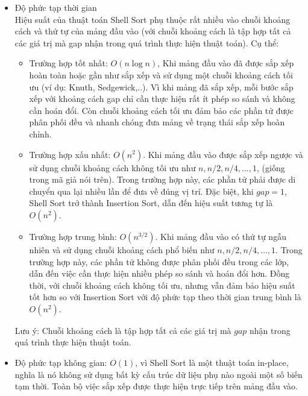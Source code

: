 \begin{itemize}
    \item Độ phức tạp thời gian\\
    Hiệu suất của thuật toán Shell Sort phụ thuộc rất nhiều vào chuỗi 
    khoảng cách và thứ tự của mảng đầu vào (với chuỗi khoảng cách là tập 
    hợp tất cả các giá trị mà gap nhận trong quá trình thực hiện thuật 
    toán). Cụ thể:
    \begin{itemize}[label=$\circ$]
        \item Trường hợp tốt nhất: $O\left(n\log{n}\right)$, Khi mảng đầu vào 
        đã được sắp xếp hoàn toàn hoặc gần như sắp xếp và sử dụng một chuỗi 
        khoảng cách tối ưu (ví dụ: Knuth, Sedgewick,..). Vì khi mảng đã sắp 
        xếp, mỗi bước sắp xếp với khoảng cách gap chỉ cần thực hiện rất ít 
        phép so sánh và không cần hoán đổi. Còn chuỗi khoảng cách tối ưu đảm 
        bảo các phần tử được phân phối đều và nhanh chóng đưa mảng về trạng 
        thái sắp xếp hoàn chỉnh.

        \pagebreak

        \item Trường hợp xấu nhất: $O\left(n^2\right)$. Khi mảng đầu vào được 
        sắp xếp ngược và sử dụng chuỗi khoảng cách không tối ưu như $n,n/2,n/4,
        \ldots,1$, (giống trong mã giả nói trên). Trong trường hợp này, các 
        phần tử phải được di chuyển qua lại nhiều lần để đưa về đúng vị trí. 
        Đặc biệt, khi $gap = 1$, Shell Sort trở thành Insertion Sort, dẫn đến 
        hiệu suất tương tự là $O\left(n^2\right)$.
        \item Trường hợp trung bình: $O\left(n^{3/2}\right)$. Khi mảng đầu vào 
        có thứ tự ngẫu nhiên và sử dụng chuỗi khoảng cách phổ biến như $n,n/2,
        n/4,\ldots,1$. Trong trường hợp này, các phần tử không được phân phối 
        đều trong các lớp, dẫn đến việc cần thực hiện nhiều phép so sánh và 
        hoán đổi hơn. Đồng thời, với chuỗi khoảng cách không tối ưu, nhưng vẫn 
        đảm bảo hiệu suất tốt hơn so với Insertion Sort với độ phức tạp theo 
        thời gian trung bình là $O\left(n^2\right)$.
    \end{itemize}
    Lưu ý: Chuỗi khoảng cách là tập hợp tất cả các giá trị mà $gap$ nhận 
    trong quá trình thực hiện thuật toán.
    
    \item Độ phức tạp không gian: $O\left(1\right)$, vì Shell Sort là một 
    thuật toán in-place, nghĩa là nó không sử dụng bất kỳ cấu trúc dữ liệu 
    phụ nào ngoài một số biến tạm thời. Toàn bộ việc sắp xếp được thực hiện 
    trực tiếp trên mảng đầu vào. 
\end{itemize}